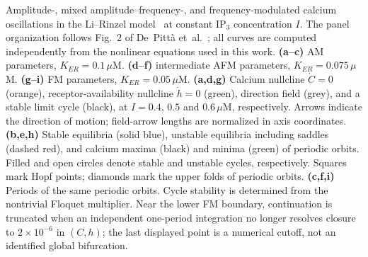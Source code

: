 Amplitude-, mixed amplitude--frequency-, and frequency-modulated calcium oscillations in the
  Li--Rinzel model~\cite{LiRinzel1994} at constant IP$_3$ concentration $I$.
  The panel organization follows Fig.~2 of De~Pitt\`a
  et~al.~\cite{DePitta2009}; all curves are computed independently from the
  nonlinear equations used in this work.
  \textbf{(a--c)} AM parameters, $K_{ER}=0.1\,\mu$M.
  \textbf{(d--f)} intermediate AFM parameters, $K_{ER}=0.075\,\mu$M.
  \textbf{(g--i)} FM parameters, $K_{ER}=0.05\,\mu$M.
  \textbf{(a,d,g)} Calcium nullcline $\dot C=0$ (orange), receptor-availability
  nullcline $\dot h=0$ (green), direction field (grey), and a stable limit cycle
  (black), at $I=0.4$, $0.5$ and $0.6\,\mu$M, respectively.
  Arrows indicate the direction of motion; field-arrow lengths are normalized
  in axis coordinates.
  \textbf{(b,e,h)} Stable equilibria (solid blue), unstable equilibria including
  saddles (dashed red), and calcium maxima (black) and minima (green) of
  periodic orbits. Filled and open circles denote stable and unstable cycles,
  respectively. Squares mark Hopf points; diamonds mark the upper folds of
  periodic orbits.
  \textbf{(c,f,i)} Periods of the same periodic orbits.
  Cycle stability is determined from the nontrivial Floquet multiplier.
  Near the lower FM boundary, continuation is truncated when an independent
  one-period integration no longer resolves closure to
  $2\times10^{-6}$ in $(C,h)$; the last displayed point is a numerical cutoff,
  not an identified global bifurcation.
